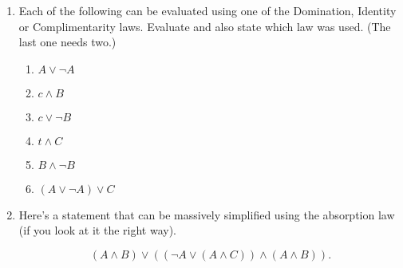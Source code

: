 \documentclass{amsart}
\begin{document}
\begin{enumerate}
\vspace{.3in}

\item Each of the following can be evaluated using one of the Domination, Identity or Complimentarity laws.
Evaluate and also state which law was used. (The last one needs two.)
\vspace{.3in}

\begin{enumerate}
\item \rule[-4pt]{0pt}{20pt} $ A \lor \lnot A $ %
\item \rule[-4pt]{0pt}{20pt} $ c \land B $ %
\item \rule[-4pt]{0pt}{20pt} $ c \lor \lnot B $ %
\item \rule[-4pt]{0pt}{20pt} $ t \land C$ %
\item \rule[-4pt]{0pt}{20pt} $ B \land \lnot B $ %
\item \rule[-4pt]{0pt}{20pt} $ (A \lor \lnot A) \lor C $ %

\end{enumerate}

\vspace{.3in}

\item Here's a statement that can be massively simplified using the absorption law (if you look at it the right way).

\[ (A \land B) \lor ( (\lnot A \lor (A \land C) )   \land (A \land B) ). \]

\vfill

\end{enumerate}
\end{document}
